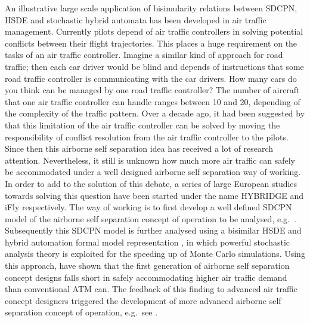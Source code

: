 \documentclass[copyright,creativecommons]{eptcs}
\begin{document}
An illustrative large scale application of bisimularity relations
between SDCPN, HSDE and stochastic hybrid automata has been
developed in air traffic management. Currently pilots depend of
air traffic controllers in solving potential conflicts between
their flight trajectories. This places a huge requirement on the
tasks of an air traffic controller. Imagine a similar kind of
approach for road traffic; then each car driver would be blind and
depends of instructions that some road traffic controller is
communicating with the car drivers. How many cars do you think can
be managed by one road traffic controller? The number of aircraft
that one air traffic controller can handle ranges between 10 and
20, depending of the complexity of the traffic pattern. Over a
decade ago, it had been suggested by \cite{RTCA1995} that this
limitation of the air traffic controller can be solved by moving
the responsibility of conflict resolution from the air traffic
controller to the pilots. Since then this airborne self separation
idea has received a lot of research attention. Nevertheless, it
still is unknown how much more air traffic can safely be
accommodated under a well designed airborne self separation way of
working. In order to add to the solution of this debate, a series
of large European studies towards solving this question have been
started under the name HYBRIDGE \cite{HYBRIDGEProject} and iFly
\cite{IFLYProject} respectively. The way of working is to first
develop a well defined SDCPN model of the airborne self separation
concept of operation to be analysed, e.g.\
\cite{EverdijKlompstraBlomKleinObbink2006}. Subsequently this
SDCPN model is further analysed using a bisimilar HSDE and hybrid
automation formal model representation
\cite{BlomKrystulBakkerKlompstraKleinObbink2007,BlomBakkerKrystul2009a},
in which powerful stochastic analysis theory is exploited for the
speeding up of Monte Carlo simulations. Using this approach,
\cite{BlomKleinObbinkBakker2009} have shown that the first
generation of airborne self separation concept designs falls short
in safely accommodating higher air traffic demand than
conventional ATM can. The feedback of this finding to advanced air
traffic concept designers triggered the development of more
advanced airborne self separation concept of operation, e.g.\ see
\cite{IFLYProject}.
\end{document}
